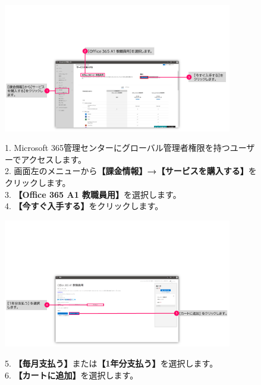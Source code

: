 \begin{figure}[h]
    \begin{minipage}{0.6\textwidth}
        \vspace{-2cm}
        \includegraphics[width=10cm]{figures/O365A1_buy00.png}
    \end{minipage}
    \begin{minipage}{0.4\textwidth}
       1. Microsoft 365管理センターにグローバル管理者権限を持つユーザーでアクセスします。\\
       2. 画面左のメニューから\textbf{【課金情報】→【サービスを購入する】}をクリックします。\\
       3. \textbf{【Office 365 A1 教職員用】}を選択します。\\
       4. \textbf{【今すぐ入手する】}をクリックします。
    \end{minipage}
\end{figure}

\begin{figure}[h]
    \begin{minipage}{0.6\textwidth}
        \vspace{-1.5cm}
        \includegraphics[width=10cm]{figures/O365A1_buy01.png}
    \end{minipage}
    \begin{minipage}{0.4\textwidth}
        5. \textbf{【毎月支払う】}または\textbf{【1年分支払う】}を選択します。\\
        6. \textbf{【カートに追加】}を選択します。
    \end{minipage}
\end{figure}

